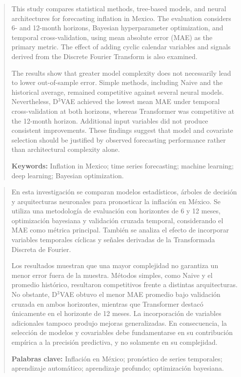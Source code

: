\documentclass[12pt,letterpaper]{article}
\begin{document}
\clearpage
{}
{}
\begin{abstract}
This study compares statistical methods, tree-based models, and neural
architectures for forecasting inflation in Mexico. The evaluation considers
6- and 12-month horizons, Bayesian hyperparameter optimization, and temporal
cross-validation, using mean absolute error (MAE) as the primary metric.
The effect of adding cyclic calendar variables and signals derived from
the Discrete Fourier Transform is also examined.

The results show that greater model complexity does not necessarily lead
to lower out-of-sample error. Simple methods, including Naive and the
historical average, remained competitive against several neural models.
Nevertheless, D$^3$VAE achieved the lowest mean MAE under temporal
cross-validation at both horizons, whereas Transformer was competitive
at the 12-month horizon. Additional input variables did not produce
consistent improvements. These findings suggest that model and covariate
selection should be justified by observed forecasting performance rather
than architectural complexity alone.

\vspace{0.4cm}
\noindent\textbf{Keywords:} Inflation in Mexico; time series forecasting; machine learning; deep learning; Bayesian optimization.
\end{abstract}

\clearpage
{}
{}
\begin{abstract}
En esta investigación se comparan modelos estadísticos, árboles de decisión
y arquitecturas neuronales para pronosticar la inflación en México. Se utiliza
una metodología de evaluación con horizontes de 6 y 12 meses, optimización
bayesiana y validación cruzada temporal, considerando el MAE como métrica
principal. También se analiza el efecto de incorporar variables temporales
cíclicas y señales derivadas de la Transformada Discreta de Fourier.

Los resultados muestran que una mayor complejidad no garantiza un menor
error fuera de la muestra. Métodos simples, como Naive y el promedio histórico, resultaron competitivos frente a distintas arquitecturas. No obstante, D$^3$VAE obtuvo el menor MAE promedio bajo validación cruzada en ambos horizontes, mientras que Transformer destacó únicamente en el horizonte
de 12 meses. La incorporación de variables adicionales tampoco produjo
mejoras generalizadas. En consecuencia, la selección de modelos y
covariables debe fundamentarse en su contribución empírica a la precisión
predictiva, y no solamente en su complejidad.

\vspace{0.4cm}
\noindent\textbf{Palabras clave:} Inflación en México; pronóstico de series temporales; aprendizaje automático; aprendizaje profundo; optimización bayesiana.
\end{abstract}
\end{document}
